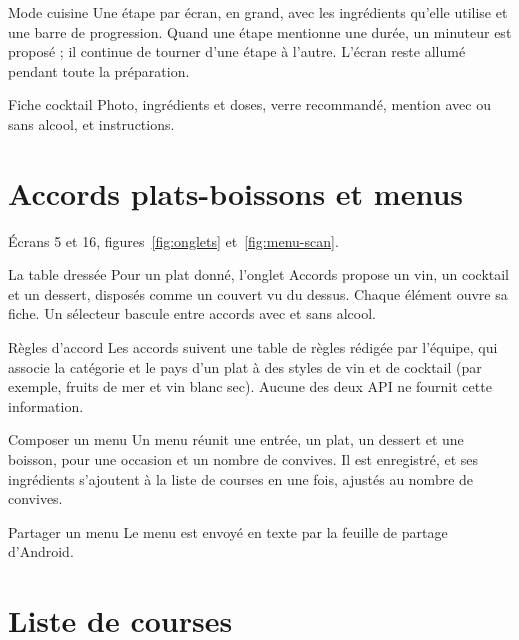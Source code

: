 \begin{exigence}[priorite=haute]{Mode cuisine}
  Une étape par écran, en grand, avec les ingrédients qu'elle utilise et une
  barre de progression. Quand une étape mentionne une durée, un minuteur est
  proposé ; il continue de tourner d'une étape à l'autre. L'écran reste
  allumé pendant toute la préparation.
\end{exigence}

\begin{exigence}[priorite=haute]{Fiche cocktail}
  Photo, ingrédients et doses, verre recommandé, mention avec ou sans alcool,
  et instructions.
\end{exigence}

\section{Accords plats-boissons et menus}

Écrans 5 et 16, figures~\ref{fig:onglets} et~\ref{fig:menu-scan}.

\begin{exigence}[priorite=haute]{La table dressée}
  Pour un plat donné, l'onglet Accords propose un vin, un cocktail et un
  dessert, disposés comme un couvert vu du dessus. Chaque élément ouvre sa
  fiche. Un sélecteur bascule entre accords avec et sans alcool.
\end{exigence}

\begin{exigence}[priorite=haute]{Règles d'accord}
  Les accords suivent une table de règles rédigée par l'équipe, qui associe
  la catégorie et le pays d'un plat à des styles de vin et de cocktail (par
  exemple, fruits de mer et vin blanc sec). Aucune des deux API ne fournit
  cette information.
\end{exigence}

\begin{exigence}[priorite=haute]{Composer un menu}
  Un menu réunit une entrée, un plat, un dessert et une boisson, pour une
  occasion et un nombre de convives. Il est enregistré, et ses ingrédients
  s'ajoutent à la liste de courses en une fois, ajustés au nombre de
  convives.
\end{exigence}

\begin{exigence}[priorite=basse]{Partager un menu}
  Le menu est envoyé en texte par la feuille de partage d'Android.
\end{exigence}

\section{Liste de courses}

